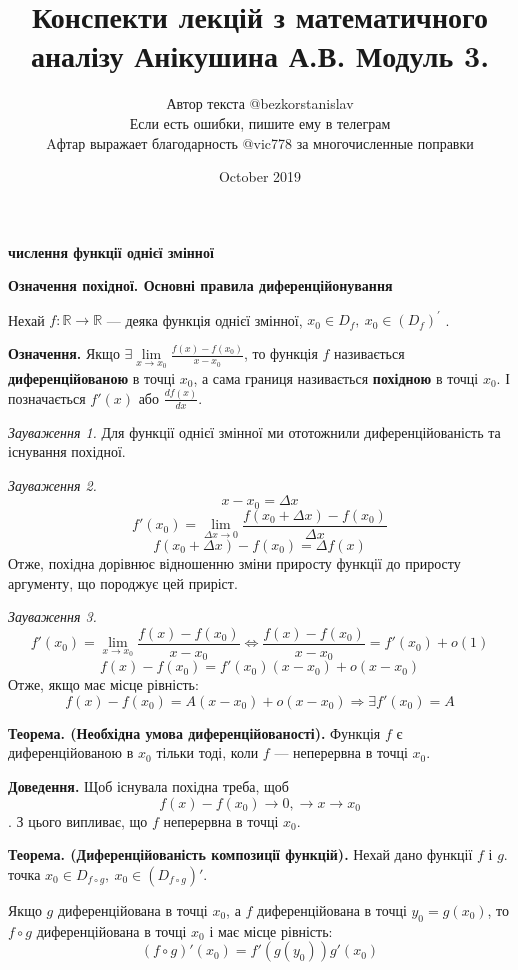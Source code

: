 \documentclass[12pt]{report}
\title{Конспекти лекцій з математичного аналізу Анікушина А.В. Модуль 3.}
\author{Автор текста @bezkorstanislav \\ Если есть ошибки, пишите ему в телеграм \\  \small{Aфтар выражает благодарность @vic778 за многочисленные поправки}}
\date{October 2019}
\begin{document}
\maketitle

\begin{center}
\textbf{ числення функції однієї змінної}
\end{center}

\begin{center}
\textbf{\large{Означення похідної. Основні правила диференційонування}}
\end{center}

Нехай $f : \mathbb{R} \to \mathbb{R}$ --- деяка функція однієї змінної, $x_0 \in D_f,\ x_0 \in (D_f)^{'}$ .

\textbf{Означення.} Якщо $\exists \lim\limits_{x \to x_0} \frac{f(x) - f(x_0)}{x - x_0}$, то функція $f$ називається 
\textbf{диференційованою} в точці $x_0$, а сама границя називається \textbf{похідною} в точці $x_0$. І позначається $f'(x)$ або $\frac{d f(x)}{d x}$.

\vspace{3mm}

\textit{Зауваження 1.} Для функції однієї змінної ми ототожнили диференційованість та існування похідної.

\textit{Зауваження 2.} $$x - x_0 = \Delta x$$
$$f'(x_0) = \lim_{\Delta x \to 0} \frac{f(x_0 + \Delta x) - f(x_0)}{\Delta x}$$
$$f(x_0 + \Delta x) - f(x_0) = \Delta f(x)$$
Отже, похідна дорівнює відношенню зміни приросту функції до приросту аргументу, що породжує цей приріст.

\textit{Зауваження 3.} 
$$f'(x_0) = \lim_{x \to x_0} \frac{f(x) - f(x_0)}{x - x_0} \Longleftrightarrow \frac{f(x) - f(x_0)}{x - x_0} = f'(x_0) + o(1)$$
$$f(x) - f(x_0) = f'(x_0)(x-x_0) + o(x-x_0)$$
Отже, якщо має місце рівність:
$$f(x) - f(x_0) = A (x - x_0) + o(x - x_0) \Longrightarrow \exists f'(x_0) = A$$

\textbf{Теорема. (Необхідна умова диференційованості).} Функція $f$ є диференційованою в $x_0$ тільки тоді, коли $f$ --- неперервна в точці $x_0$.

\textbf{Доведення.} Щоб існувала похідна треба, щоб
$$f(x) - f(x_0) \to 0,\to x \to x_0$$.
З цього випливає, що $f$ неперервна в точці $x_0$.

\textbf{Теорема. (Диференційованість композиції функцій).}  Нехай дано функції $f$ і $g$. точка $x_0 \in D_{f \circ g},\ x_0 \in (D_{f \circ g})'$.

Якщо $g$ диференційована в точці $x_0$, а $f$ диференційована в точці $y_0 = g(x_0)$, то $f \circ g$ диференційована в точці $x_0$ і має місце рівність:
$$(f \circ g)' (x_0) = f'(g(y_0)) g'(x_0)$$
\end{document}
